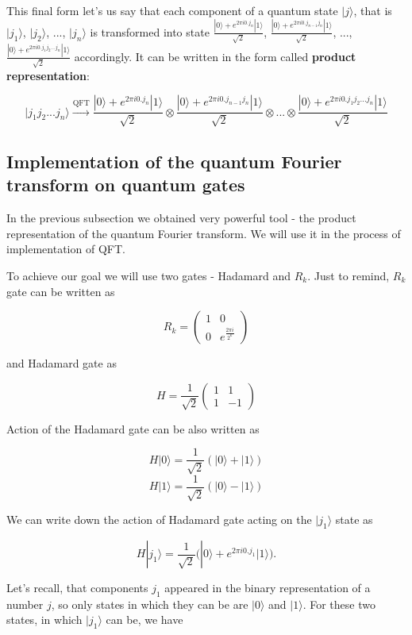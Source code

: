 This final form let's us say that each component of a quantum state $|j\rangle$, that is $|j_1\rangle$, $|j_2\rangle$, ..., $|j_n\rangle$ is transformed into state $\frac{|0\rangle + e^{2 \pi i 0.j_n}|1\rangle}{\sqrt{2}}$, $\frac{|0\rangle + e^{2 \pi i 0.j_{n - 1} j_n}|1\rangle}{\sqrt{2}}$, ..., $\frac{|0\rangle + e^{2 \pi i 0.j_1 j_2 ... j_n}|1\rangle}{\sqrt{2}}$ accordingly. It can be written in the form called \textbf{product representation}:

\[ |j_1 j_2 ... j_n\rangle \xrightarrow{\text{QFT}} \frac{|0\rangle + e^{2 \pi i 0.j_n}|1\rangle}{\sqrt{2}} \otimes \frac{|0\rangle + e^{2 \pi i 0.j_{n - 1} j_n}|1\rangle}{\sqrt{2}} \otimes ... \otimes \frac{|0\rangle + e^{2 \pi i 0.j_1 j_2 ... j_n}|1\rangle}{\sqrt{2}} \]

\subsection{Implementation of the quantum Fourier transform on quantum gates}

In the previous subsection we obtained very powerful tool - the product representation of the quantum Fourier transform. We will use it in the process of implementation of QFT.

To achieve our goal we will use two gates - Hadamard and $R_k$. Just to remind, $R_k$ gate can be written as 

\[ R_k = \begin{pmatrix} 1 & 0 \\ 0 & e^{\frac{2 \pi i}{2^k}}\end{pmatrix}\]

and Hadamard gate as

\[ H = \frac{1}{\sqrt{2}}\begin{pmatrix}
1 & 1 \\ 1 & -1
\end{pmatrix}\]

Action of the Hadamard gate can be also written as

\[ H|0\rangle = \frac{1}{\sqrt{2}}(|0\rangle + |1\rangle) \]
\[ H|1\rangle = \frac{1}{\sqrt{2}}(|0\rangle - |1\rangle) \]

We can write down the action of Hadamard gate acting on the $|j_1\rangle$ state as

\[ H|j_1\rangle = \frac{1}{\sqrt{2}} \bigg( |0\rangle + e^{2 \pi i 0.j_1} |1\rangle \bigg). \]

Let's recall, that components $j_1$ appeared in the binary representation of a number $j$, so only states in which they can be are $|0\rangle$ and $|1\rangle$. For these two states, in which $|j_1\rangle$ can be, we have

